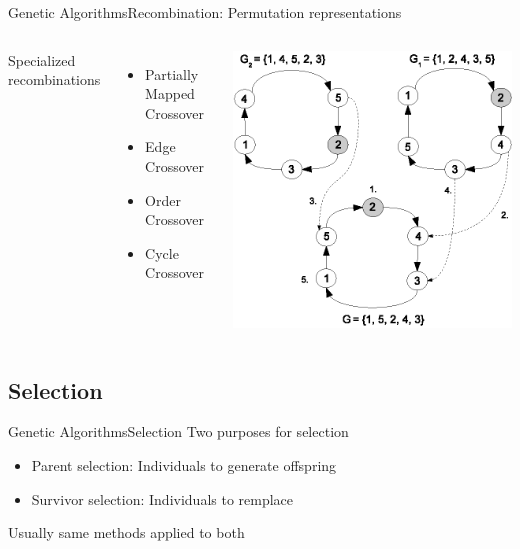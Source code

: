 \documentclass[10pt,compress]{beamer} %
\begin{document}
\begin{frame}{Genetic Algorithms}{Recombination: Permutation representations}
    \begin{columns}
		Specialized recombinations
		\begin{itemize}
		\item Partially Mapped Crossover
		\item Edge Crossover
		\item Order Crossover
		\item Cycle Crossover
		\end{itemize}

		\includegraphics[width=\linewidth]{figs/permutation-xover.eps}
	\end{columns}
\end{frame}

\subsection{Selection}
\begin{frame}{Genetic Algorithms}{Selection}
	Two purposes for selection
	\begin{itemize}
		\item Parent selection: Individuals to generate offspring
		\item Survivor selection: Individuals to remplace
  	\end{itemize}
	Usually same methods applied to both
\end{frame}
\end{document}
